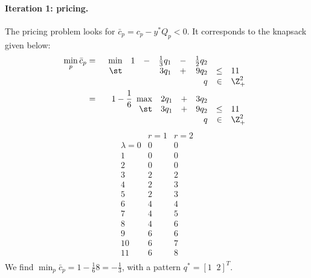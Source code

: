 \paragraph{Iteration 1: pricing. } The pricing problem looks for
$\bar c_p = c_p - y^* Q_p < 0$. It corresponds to the knapsack
given below:
\begin{eqnarray*}
\min_p \bar c_p & = &
\begin{array}[t]{rrcrcrcl}
\min & 1 & - & \frac{1}{3} q_1 & - & \frac{1}{2} q_2 &      &    \\
\st  &   &   &           3 q_1 & + &           9 q_2 & \leq & 11 \\
     &   &   &                 &   &             q   & \in  & \Z^2_+
\end{array} \\
& = & 1 - \frac{1}{6}
\begin{array}[t]{rrcrcl}
\max & 2 q_1 & + & 3 q_2 &      &    \\
\st  & 3 q_1 & + & 9 q_2 & \leq & 11 \\
     &       &   &   q   & \in  & \Z^2_+
\end{array}
\end{eqnarray*}
\[
\begin{array}{r|rr}
 & r=1 & r=2 \\
\hline
\lambda =
 0 & 0 & 0 \\
 1 & 0 & 0 \\
 2 & 0 & 0 \\
 3 & 2 & 2 \\
 4 & 2 & 3 \\
 5 & 2 & 3 \\
 6 & 4 & 4 \\
 7 & 4 & 5 \\
 8 & 4 & 6 \\
 9 & 6 & 6 \\
 10 & 6 & 7 \\
 11 & 6 & 8 \\
\end{array}
\]
We find $\min_p \bar c_p = 1 - \frac{1}{6} 8 = -\frac{1}{3}$,
with a pattern $q^* = [ 1 \;\; 2 ]^T$.

